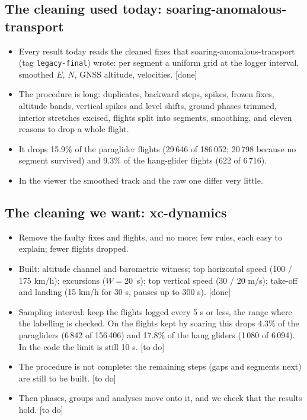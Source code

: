 \documentclass[11pt]{article}
\newcommand{\done}{\textcolor{green!45!black}{\textsf{[done]}}}
\newcommand{\todo}{\textcolor{orange!85!black}{\textsf{[to do]}}}
\begin{document}
\subsection*{The cleaning used today: soaring-anomalous-transport}
\begin{itemize}
  \item Every result today reads the cleaned fixes that soaring-anomalous-transport (tag
        \texttt{legacy-final}) wrote: per segment a uniform grid at the logger interval, smoothed
        $E$, $N$, GNSS altitude, velocities. \done
  \item The procedure is long: duplicates, backward steps, spikes, frozen fixes, altitude bands,
        vertical spikes and level shifts, ground phases trimmed, interior stretches excised, flights
        split into segments, smoothing, and eleven reasons to drop a whole flight.
  \item It drops 15.9\% of the paraglider flights (29\,646 of 186\,052; 20\,798 because no segment
        survived) and 9.3\% of the hang-glider flights (622 of 6\,716).
  \item In the viewer the smoothed track and the raw one differ very little.
\end{itemize}

\subsection*{The cleaning we want: xc-dynamics}
\begin{itemize}
  \item Remove the faulty fixes and flights, and no more; few rules, each easy to explain; fewer
        flights dropped.
  \item Built: altitude channel and barometric witness; top horizontal speed (100 / 175 km/h);
        excursions ($W=20$~s); top vertical speed (30 / 20 m/s); take-off and landing (15 km/h for
        30 s, pauses up to 300 s). \done
  \item Sampling interval: keep the flights logged every 5 s or less, the range where the labelling
        is checked. On the flights kept by soaring this drops 4.3\% of the paragliders (6\,842 of
        156\,406) and 17.8\% of the hang gliders (1\,080 of 6\,094). In the code the limit is still
        10 s. \todo
  \item The procedure is not complete: the remaining steps (gaps and segments next) are still to be
        built. \todo
  \item Then phases, groups and analyses move onto it, and we check that the results hold. \todo
\end{itemize}
\end{document}
